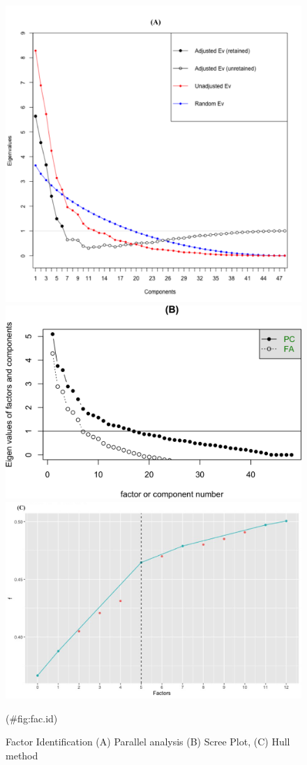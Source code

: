 \documentclass[
  english,
  man]{apa6}
\begin{document}
\begin{figure}

{\centering \includegraphics[width=0.5\linewidth,height=0.5\textheight]{parallel} \includegraphics[width=0.5\linewidth,height=0.5\textheight]{manuscript_files/figure-latex/fac.id-2} \includegraphics[width=0.5\linewidth,height=0.5\textheight]{HUll method} 

}

\caption{Factor Identification (A) Parallel analysis (B) Scree Plot, (C) Hull method}(\#fig:fac.id)
\end{figure}
\end{document}

